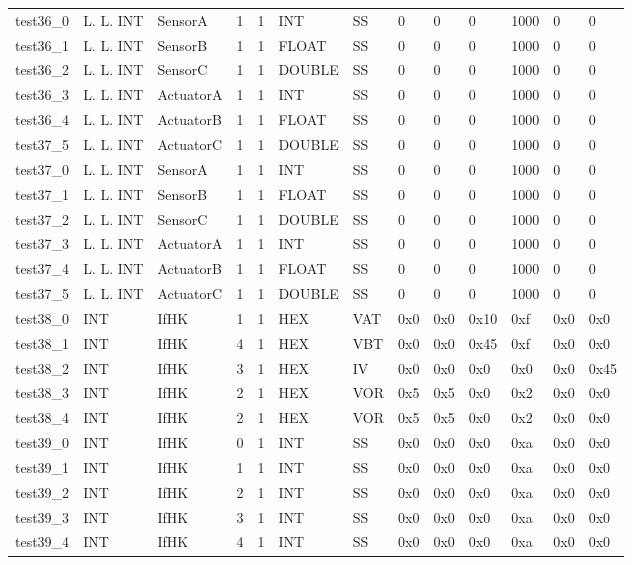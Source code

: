 \begin{longtable}{|l|l|l|p{0.5cm}|p{0.5cm}|l|p{0.5cm}|p{0.5cm}|p{0.5cm}|l|l|p{0.5cm}|l|}
test36\_0 & L. L. INT & SensorA & 1 & 1 & INT & SS & 0 & 0 & 0 & 1000 & 0 & 0 \\
test36\_1 & L. L. INT & SensorB & 1 & 1 & FLOAT & SS & 0 & 0 & 0 & 1000 & 0 & 0 \\
test36\_2 & L. L. INT & SensorC & 1 & 1 & DOUBLE & SS & 0 & 0 & 0 & 1000 & 0 & 0 \\
test36\_3 & L. L. INT & ActuatorA & 1 & 1 & INT & SS & 0 & 0 & 0 & 1000 & 0 & 0 \\
test36\_4 & L. L. INT & ActuatorB & 1 & 1 & FLOAT & SS & 0 & 0 & 0 & 1000 & 0 & 0 \\
test37\_5 & L. L. INT & ActuatorC & 1 & 1 & DOUBLE & SS & 0 & 0 & 0 & 1000 & 0 & 0 \\
test37\_0 & L. L. INT & SensorA & 1 & 1 & INT & SS & 0 & 0 & 0 & 1000 & 0 & 0 \\
test37\_1 & L. L. INT & SensorB & 1 & 1 & FLOAT & SS & 0 & 0 & 0 & 1000 & 0 & 0 \\
test37\_2 & L. L. INT & SensorC & 1 & 1 & DOUBLE & SS & 0 & 0 & 0 & 1000 & 0 & 0 \\
test37\_3 & L. L. INT & ActuatorA & 1 & 1 & INT & SS & 0 & 0 & 0 & 1000 & 0 & 0 \\
test37\_4 & L. L. INT & ActuatorB & 1 & 1 & FLOAT & SS & 0 & 0 & 0 & 1000 & 0 & 0 \\
test37\_5 & L. L. INT & ActuatorC & 1 & 1 & DOUBLE & SS & 0 & 0 & 0 & 1000 & 0 & 0 \\
test38\_0 & INT & IfHK & 1 & 1 & HEX & VAT & 0x0 & 0x0 & 0x10 & 0xf & 0x0 & 0x0 \\
test38\_1 & INT & IfHK & 4 & 1 & HEX & VBT & 0x0 & 0x0 & 0x45 & 0xf & 0x0 & 0x0 \\
test38\_2 & INT & IfHK & 3 & 1 & HEX & IV & 0x0 & 0x0 & 0x0 & 0x0 & 0x0 & 0x45 \\
test38\_3 & INT & IfHK & 2 & 1 & HEX & VOR & 0x5 & 0x5 & 0x0 & 0x2 & 0x0 & 0x0 \\
test38\_4 & INT & IfHK & 2 & 1 & HEX & VOR & 0x5 & 0x5 & 0x0 & 0x2 & 0x0 & 0x0 \\
test39\_0 & INT & IfHK & 0 & 1 & INT & SS & 0x0 & 0x0 & 0x0 & 0xa & 0x0 & 0x0 \\
test39\_1 & INT & IfHK & 1 & 1 & INT & SS & 0x0 & 0x0 & 0x0 & 0xa & 0x0 & 0x0 \\
test39\_2 & INT & IfHK & 2 & 1 & INT & SS & 0x0 & 0x0 & 0x0 & 0xa & 0x0 & 0x0 \\
test39\_3 & INT & IfHK & 3 & 1 & INT & SS & 0x0 & 0x0 & 0x0 & 0xa & 0x0 & 0x0 \\
test39\_4 & INT & IfHK & 4 & 1 & INT & SS & 0x0 & 0x0 & 0x0 & 0xa & 0x0 & 0x0 \\

\end{longtable}

